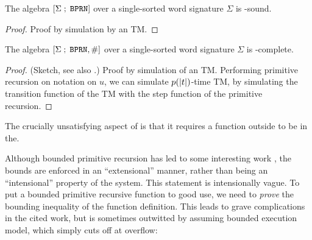 \begin{theorem} \label{thm:bprn-fptime-sound} The algebra
$\mathopen{}\left[{\Sigma\mathrel{};\mathrel{}\mathtt{BPRN}}\right]\mathclose{}$ over a single-sorted word signature $\Sigma$
is \FPTIME{}-sound.\end{theorem}

\begin{proof} Proof by simulation by an \FPTIME{} TM. \end{proof}

\begin{theorem} \label{thm:bprn-fptime-complete} The algebra
$\mathopen{}\left[{\Sigma\mathrel{};\mathrel{}\mathtt{BPRN},\mathtt{\#}}\right]\mathclose{}$ over a single-sorted word
signature $\Sigma$ is \FPTIME{}-complete.\end{theorem}

\begin{proof} (Sketch, see also \cite{rose-1984}.) Proof by simulation of an
\FPTIME{} TM. Performing primitive recursion on notation on $u$, we can
simulate $p{\mathopen{}\left({{\mathopen{}\left|{t}\right|\mathclose{}}}\right)\mathclose{}}$-time TM, by simulating the transition function of the
TM with the step function of the primitive recursion. \end{proof}

The crucially unsatisfying aspect of \cite{thm:bprn-fptime-complete} is that it requires a function outside \FPTIME{} to be in the.


Although bounded primitive recursion has led to some interesting work
\cite{cook-1975, buss-phd-1985-6, cook-urquhart-1993}, the bounds are enforced
in an ``extensional'' manner, rather than being an ``intensional'' property of
the system. This statement is intensionally vague. To put a bounded primitive
recursive function to good use, we need to \emph{prove} the bounding inequality
of the function definition. This leads to grave complications in the cited
work, but is sometimes outwitted by assuming bounded execution model, which
simply cuts off at overflow:




